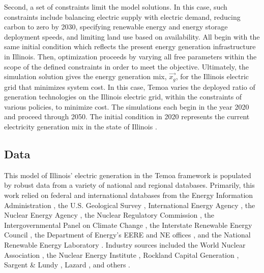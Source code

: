 Second, a set of constraints limit the model solutions. In this case, such 
constraints include balancing electric supply with electric demand, reducing 
carbon to zero by 2030, specifying renewable energy and energy
storage deployment speeds, and limiting land use based on availability.
All begin with the same initial condition which reflects the present energy generation infrastructure in Illinois. 
Then, optimization 
proceeds by varying all free parameters within the scope of the defined 
constraints in order to meet the objective. Ultimately, the simulation solution 
gives the energy generation mix, $\vec{x_g}$, for the Illinois electric grid that minimizes system cost. 
In this case, Temoa varies the 
deployed ratio of generation technologies on the Illinois electric grid, within 
the constraints of various policies, to minimize cost. The simulations each 
begin in the year 2020 and proceed through 2050. The initial condition in 2020 
represents the current electricity generation mix in the state of Illinois 
.

\FloatBarrier
\subsection{Data}

This model of Illinois' electric generation in the 
Temoa framework
is populated by robust data from a variety of national and regional 
databases. Primarily, this work relied on federal and international databases from the 
Energy Information Administration 
\cite{us_energy_information_administration_eia_preliminary_2021,energy_information_administration_state_2020,us_energy_information_administration_eia_electric_2021,us_energy_information_administration_eia_illinois_2020}, 
the U.S. Geological Survey \cite{hoen_united_2018}, 
International Energy Agency \cite{lorenczik_projected_2020}, 
the Nuclear Energy Agency \cite{crozat_full_2018}, 
the Nuclear Regulatory Commission 
\cite{united_states_nuclear_regulatory_commission_illinois_2020}, 
the Intergovernmental Panel on Climate Change 
\cite{intergovernmental_panel_on_climate_change_annex_2014,intergovernmental_panel_on_climate_change_climate_2014,intergovernmental_panel_on_climate_change_climate_2014-1,intergovernmental_panel_on_climate_change_climate_2014-2},
the Interstate Renewable Energy Council 
\cite{sherwood_us_2009,sherwood_us_2010,sherwood_us_2011,brown_solid_1996,sherwood_us_2012,sherwood_us_2013,sherwood_us_2014}, 
the Department of Energy's EERE and NE offices 
\cite{us_department_of_energy_capital_2016}, and the National Renewable Energy 
Laboratory 
\cite{nrel_national_renewable_energy_laboratory_2020_2020,sengupta_national_2018}.
Industry sources included the World Nuclear Association
\cite{world_nuclear_association_nuclear_2017}
, 
the Nuclear Energy Institute 
\cite{desai_nuclear_2018,desai_nuclear_2020,murphy_impacts_2019,tessum_air_2019},
Rockland Capital Generation \cite{rockland_capital_natural_2021},
Sargent \& Lundy \cite{sargent__lundy_capital_2020}, 
Lazard \cite{ray_lazards_2020},
and others 
\cite{the_solar_foundation_national_2020,solar_energy_industries_association_illinois_2020,rutovitz_calculating_2015}.


